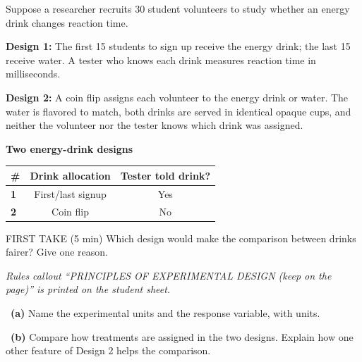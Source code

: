 \documentclass[11pt]{article}
\begin{document}
Suppose a researcher recruits 30 student volunteers to study whether an energy drink changes reaction time.\par\smallskip \textbf{Design 1:} The first 15 students to sign up receive the energy drink; the last 15 receive water. A tester who knows each drink measures reaction time in milliseconds.\par \textbf{Design 2:} A coin flip assigns each volunteer to the energy drink or water. The water is flavored to match, both drinks are served in identical opaque cups, and neither the volunteer nor the tester knows which drink was assigned.\par
\begin{center}
\textbf{Two energy-drink designs}\par\smallskip
\begin{tabular}{|l|c|c|}
\hline
\textbf{\#} & \textbf{Drink allocation} & \textbf{Tester told drink?} \\ \hline
\textbf{1} & First/last signup & Yes \\ \hline
\textbf{2} & Coin flip & No \\ \hline
\end{tabular}
\end{center}
\begin{firsttakebox}{FIRST TAKE (5 min)}
Which design would make the comparison between drinks fairer? Give one reason.\par
{}
\end{firsttakebox}

\textit{Rules callout ``PRINCIPLES OF EXPERIMENTAL DESIGN (keep on the page)'' is printed on the student sheet.}\par\medskip

~\textbf{(a)} Name the experimental units and the response variable, with units.\par
{}

~\textbf{(b)} Compare how treatments are assigned in the two designs. Explain how one other feature of Design 2 helps the comparison.\par
{}
\end{document}
